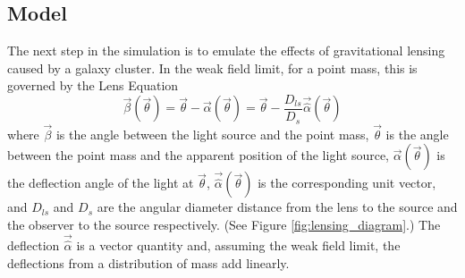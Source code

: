\documentclass[10pt,twoside]{article}
\theoremstyle{definition}
\theoremstyle{exercise}
\begin{document}
\subsection{Model}
The next step in the simulation is to emulate the effects of gravitational lensing caused by a galaxy cluster. In the weak field limit, for a point mass, this is governed by the Lens Equation
\begin{equation}
  \vec{\beta}(\vec{\theta}) = \vec{\theta} - \vec{\alpha}(\vec{\theta}) = \vec{\theta} - \frac{D_{ls}}{D_s}\vec{\hat{\alpha}}(\vec{\theta})
  \label{eq:lensing}
\end{equation}
where $\vec{\beta}$ is the angle between the light source and the point mass, $\vec{\theta}$ is the angle between the point mass and the apparent position of the light source, $\vec{\alpha}(\vec{\theta})$ is the deflection angle of the light at $\vec{\theta}$, $\vec{\hat{\alpha}}(\vec{\theta})$ is the corresponding unit vector, and $D_{ls}$ and $D_s$ are the angular diameter distance from the lens to the source and the observer to the source respectively. (See Figure \ref{fig:lensing_diagram}.) The deflection $\vec{\hat{\alpha}}$ is a vector quantity and, assuming the weak field limit, the deflections from a distribution of mass add linearly.
\end{document}
